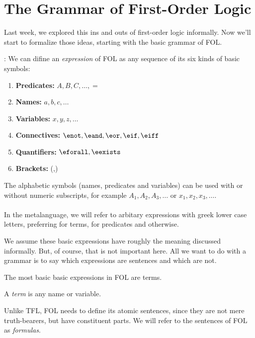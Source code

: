 \section{The Grammar of First-Order Logic}

Last week, we explored this ins and outs of first-order logic informally. Now
we'll start to formalize those ideas, starting with the basic grammar of FOL.

\begin{definition}: We can difine an
  \label{def:fol-expression}
  \emph{expression} of FOL as any sequence of its six kinds of basic symbols:\\
  \begin{enumerate}
    \item \textbf{Predicates:} $A,B,C,\dots,=$
    \item \textbf{Names:} $a,b,c,\dots$
    \item \textbf{Variables:} $x,y,z,\dots$
    \item \textbf{Connectives:} $\enot,\eand,\eor,\eif,\eiff$ 
    \item \textbf{Quantifiers:} $\eforall,\eexists$
    \item \textbf{Brackets:} (,)
  \end{enumerate}
  The alphabetic symbols (names, predicates and variables) can be used with
  or without numeric subscripts, for example $A_1, A_2, A_3, \dots$ or
  $x_1, x_2, x_3, \dots$. \\
  \\
  In the metalanguage, we will refer to arbitary expressions with greek lower
  case letters, preferring \ealpha for terms, \ebeta for predicates and \egamma
  otherwise.
\end{definition}

We assume these basic expressions have roughly the meaning discussed informally.
But, of course, that is not important here. All we want to do with a grammar is
to say which expressions are sentences and which are not.

The most basic basic expressions in FOL are terms. 

\begin{definition}[Term]
  \label{def:fol-term}
  A \emph{term} is any name or variable.
\end{definition}

Unlike TFL, FOL needs to define its atomic sentences, since they are not mere
truth-bearers, but have constituent parts. We will refer to the sentences of
FOL as \emph{formulas}.

